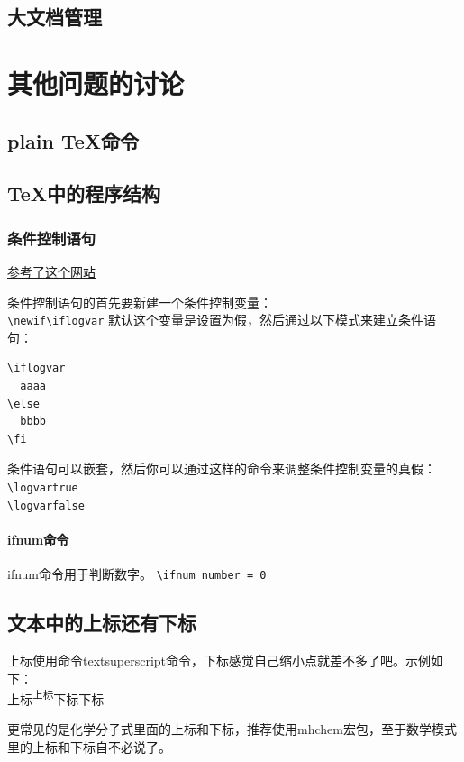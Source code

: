 \documentclass[11pt,oneside]{book}
\begin{document}
\begin{common-format}
\section{大文档管理}



\chapter{其他问题的讨论}

\section{plain TeX命令}


\section{TeX中的程序结构}
\subsection{条件控制语句}
\label{sec:条件控制语句}
\href{http://handyfloss.wordpress.com/2007/08/29/latex-programming-how-to-implement-conditionals/}{参考了这个网站}

条件控制语句的首先要新建一个条件控制变量：\\
\verb+\newif\iflogvar+
默认这个变量是设置为假，然后通过以下模式来建立条件语句：
\begin{Verbatim}
\iflogvar
  aaaa
\else
  bbbb
\fi
\end{Verbatim}
条件语句可以嵌套，然后你可以通过这样的命令来调整条件控制变量的真假：\\
\verb+\logvartrue+\\
\verb+\logvarfalse+

\subsubsection{ifnum命令}
ifnum命令用于判断数字。
\verb+\ifnum number = 0+

\section{文本中的上标还有下标}
上标使用命令textsuperscript命令，下标感觉自己缩小点就差不多了吧。示例如下：\\
上标\textsuperscript{上标}下标{\scriptsize 下标}

更常见的是化学分子式里面的上标和下标，推荐使用mhchem宏包，至于数学模式里的上标和下标自不必说了。



\end{common-format}
\end{document}
